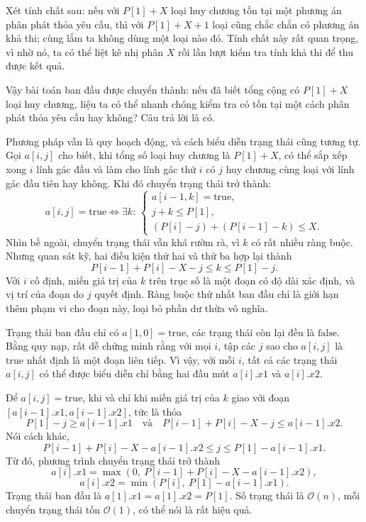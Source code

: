 \documentclass[11pt]{article}
\newcommand{\Oh}{\mathcal{O}}
\newcommand{\true}{\mathrm{true}}
\newcommand{\false}{\mathrm{false}}
\begin{document}
Xét tính chất sau: nếu với $P[1]+X$ loại huy chương tồn tại một phương án
phân phát thỏa yêu cầu, thì với $P[1]+X+1$ loại cũng chắc chắn có phương án
khả thi; cùng lắm ta không dùng một loại nào đó. Tính chất này rất quan trọng,
vì nhờ nó, ta có thể liệt kê nhị phân $X$ rồi lần lượt kiểm tra tính khả thi
để thu được kết quả.

Vậy bài toán ban đầu được chuyển thành: nếu đã biết tổng cộng có $P[1]+X$ loại
huy chương, liệu ta có thể nhanh chóng kiểm tra có tồn tại một cách phân phát
thỏa yêu cầu hay không? Câu trả lời là có.

Phương pháp vẫn là quy hoạch động, và cách biểu diễn trạng thái cũng tương tự.
Gọi $a[i,j]$ cho biết, khi tổng số loại huy chương là $P[1]+X$, có thể sắp xếp
xong $i$ lính gác đầu và làm cho lính gác thứ $i$ có $j$ huy chương cùng loại
với lính gác đầu tiên hay không. Khi đó chuyển trạng thái trở thành:
\[
  a[i,j]=\true
  \Longleftrightarrow
  \exists k:\,
  \begin{cases}
    a[i-1,k]=\true,\\
    j+k\le P[1],\\
    (P[i]-j)+(P[i-1]-k)\le X.
  \end{cases}
\]
Nhìn bề ngoài, chuyển trạng thái vẫn khá rườm rà, vì $k$ có rất nhiều ràng
buộc. Nhưng quan sát kỹ, hai điều kiện thứ hai và thứ ba hợp lại thành
\[
  P[i-1]+P[i]-X-j \le k \le P[1]-j.
\]
Với $i$ cố định, miền giá trị của $k$ trên trục số là một đoạn có độ dài xác
định, và vị trí của đoạn do $j$ quyết định. Ràng buộc thứ nhất ban đầu chỉ là
giới hạn thêm phạm vi cho đoạn này, loại bỏ phần dư thừa vô nghĩa.

Trạng thái ban đầu chỉ có $a[1,0]=\true$, các trạng thái còn lại đều là
$\false$. Bằng quy nạp, rất dễ chứng minh rằng với mọi $i$, tập các $j$ sao
cho $a[i,j]$ là $\true$ nhất định là một đoạn liên tiếp. Vì vậy, với mỗi $i$,
tất cả các trạng thái $a[i,j]$ có thể được biểu diễn chỉ bằng hai đầu mút
$a[i].x1$ và $a[i].x2$.

Để $a[i,j]=\true$, khi và chỉ khi miền giá trị của $k$ giao với đoạn
$[a[i-1].x1,a[i-1].x2]$, tức là thỏa
\[
  P[1]-j \ge a[i-1].x1
  \quad\text{và}\quad
  P[i-1]+P[i]-X-j \le a[i-1].x2.
\]
Nói cách khác,
\[
  P[i-1]+P[i]-X-a[i-1].x2 \le j \le P[1]-a[i-1].x1.
\]
Từ đó, phương trình chuyển trạng thái trở thành
\[
  a[i].x1=\max(0,\ P[i-1]+P[i]-X-a[i-1].x2),
\]
\[
  a[i].x2=\min(P[i],\ P[1]-a[i-1].x1).
\]
Trạng thái ban đầu là $a[1].x1=a[1].x2=P[1]$. Số trạng thái là $\Oh(n)$, mỗi
chuyển trạng thái tốn $\Oh(1)$, có thể nói là rất hiệu quả.
\end{document}

